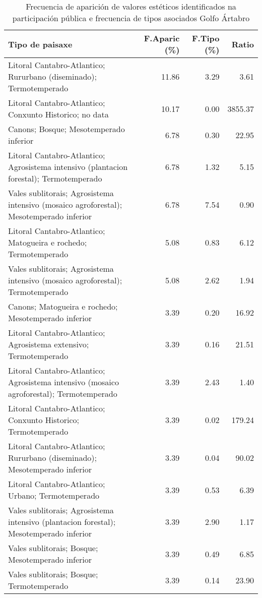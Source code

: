 \begin{table}[p]
\centering
\caption{Frecuencia de aparición de valores estéticos identificados na participación pública e frecuencia de tipos asociados Golfo Ártabro} 
\label{vsixotest1}
\begin{tabular}{lrrr}
  \hline
Tipo de paisaxe & F.Aparic (\%) & F.Tipo (\%) & Ratio \\ 
  \hline
Litoral Cantabro-Atlantico; Rururbano (diseminado); Termotemperado & 11.86 & 3.29 & 3.61 \\ 
  Litoral Cantabro-Atlantico; Conxunto Historico; no data & 10.17 & 0.00 & 3855.37 \\ 
  Canons; Bosque; Mesotemperado inferior & 6.78 & 0.30 & 22.95 \\ 
  Litoral Cantabro-Atlantico; Agrosistema intensivo (plantacion forestal); Termotemperado & 6.78 & 1.32 & 5.15 \\ 
  Vales sublitorais; Agrosistema intensivo (mosaico agroforestal); Mesotemperado inferior & 6.78 & 7.54 & 0.90 \\ 
  Litoral Cantabro-Atlantico; Matogueira e rochedo; Termotemperado & 5.08 & 0.83 & 6.12 \\ 
  Vales sublitorais; Agrosistema intensivo (mosaico agroforestal); Termotemperado & 5.08 & 2.62 & 1.94 \\ 
  Canons; Matogueira e rochedo; Mesotemperado inferior & 3.39 & 0.20 & 16.92 \\ 
  Litoral Cantabro-Atlantico; Agrosistema extensivo; Termotemperado & 3.39 & 0.16 & 21.51 \\ 
  Litoral Cantabro-Atlantico; Agrosistema intensivo (mosaico agroforestal); Termotemperado & 3.39 & 2.43 & 1.40 \\ 
  Litoral Cantabro-Atlantico; Conxunto Historico; Termotemperado & 3.39 & 0.02 & 179.24 \\ 
  Litoral Cantabro-Atlantico; Rururbano (diseminado); Mesotemperado inferior & 3.39 & 0.04 & 90.02 \\ 
  Litoral Cantabro-Atlantico; Urbano; Termotemperado & 3.39 & 0.53 & 6.39 \\ 
  Vales sublitorais; Agrosistema intensivo (plantacion forestal); Mesotemperado inferior & 3.39 & 2.90 & 1.17 \\ 
  Vales sublitorais; Bosque; Mesotemperado inferior & 3.39 & 0.49 & 6.85 \\ 
  Vales sublitorais; Bosque; Termotemperado & 3.39 & 0.14 & 23.90 \\ 

\end{tabular}
\end{table}

